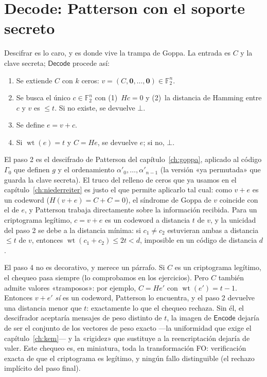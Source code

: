 \documentclass[11pt,a4paper,oneside]{report}
\newcommand{\F}{\mathbb{F}}
\newcommand{\wt}{\operatorname{wt}}
\newcommand{\Ftwo}{\F_2}
\begin{document}
\section{\textsf{Decode}: Patterson con el soporte secreto}

Descifrar es lo caro, y es donde vive la trampa de Goppa. La entrada es
$C$ y la clave secreta; $\textsf{Decode}$ procede así:

\begin{enumerate}[leftmargin=1.8em,itemsep=2pt]
  \item Se extiende $C$ con $k$ ceros: $v=(C,\mathbf{0},\dots,\mathbf{0})
        \in\Ftwo^{n}$.
  \item Se busca el único $c\in\Ftwo^{n}$ con (1)~$Hc=0$ y (2)~la distancia
        de Hamming entre $c$ y $v$ es $\le t$. Si no existe, se
        devuelve $\bot$.
  \item Se define $e=v+c$.
  \item Si $\wt(e)=t$ y $C=He$, se devuelve $e$; si no, $\bot$.
\end{enumerate}

El paso 2 es el descifrado de Patterson del capítulo~\ref{ch:goppa},
aplicado al código $\Gamma_0$ que definen $g$ y el ordenamiento
$\alpha'_0,\dots,\alpha'_{n-1}$ (la versión «ya permutada» que guarda
la clave secreta). El truco del relleno de ceros que ya usamos en el
capítulo~\ref{ch:niederreiter} es justo el que permite aplicarlo tal
cual: como $v+e$ es un codeword ($H(v+e)=C+C=0$), el síndrome de
Goppa de $v$ coincide con el de $e$, y Patterson trabaja directamente
sobre la información recibida.
Para un criptograma legítimo, $c=v+e$ es un codeword a distancia $t$
de $v$, y la unicidad del paso 2 se debe a la distancia mínima:
si $c_1\ne c_2$ estuvieran ambas a distancia $\le t$ de $v$, entonces
$\wt(c_1+c_2)\le2t<d$, imposible en un código de distancia $d$.

El paso 4 no es decorativo, y merece un párrafo. Si $C$ es un
criptograma legítimo, el chequeo pasa siempre (lo comprobamos en los
ejercicios). Pero $C$ también admite valores «tramposos»: por ejemplo,
$C=He'$ con $\wt(e')=t-1$. Entonces $v+e'$ \emph{sí} es un codeword,
Patterson lo encuentra, y el paso 2 devuelve una distancia menor que
$t$: exactamente lo que el chequeo rechaza. Sin él, el descifrador
aceptaría mensajes de peso distinto de $t$, la imagen de
$\textsf{Encode}$ dejaría de ser el conjunto de los vectores de peso
exacto ---la uniformidad que exige el capítulo~\ref{ch:kem}--- y la
«rigidez» que sustituye a la reencriptación dejaría de valer. Este
chequeo es, en miniatura, toda la transformación FO: verificación
exacta de que el criptograma es legítimo, y ningún fallo distinguible
(el rechazo implícito del paso final).
\end{document}
